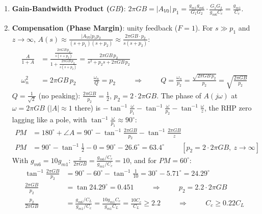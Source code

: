 \begin{enumerate}
  \item \textbf{Gain-Bandwidth Product (\(GB\))}:
    \(2\pi GB = |A_{V0}|\, p_1 = \frac{g_{m1} g_{m6}}{G_1 G_2} \cdot \frac{G_1 G_2}{g_{m6} C_c} = \frac{g_{m1}}{C_c}\).
  \item \textbf{Compensation (Phase Margin)}: unity feedback (\(F = 1\)). For
    \(s \gg p_1\) and \(z \to \infty\), \(A(s) \approx \frac{|A_{V0}| p_1 p_2}{(s + p_1)(s + p_2)} \approx \frac{2\pi GB \cdot p_2}{s(s + p_2)}\):
    \begin{align*}
      \frac{A}{1 + A} &= \frac{\frac{2\pi GB\, p_2}{s(s + p_2)}}{1 + \frac{2\pi GB\, p_2}{s(s + p_2)}} = \frac{2\pi GB\, p_2}{s^2 + p_2 s + 2\pi GB\, p_2} \\
      \omega_n^2 &= 2\pi GB\, p_2 \hspace{1cm} \frac{\omega_n}{Q} = p_2 \hspace{1cm} \Rightarrow \hspace{1cm} Q = \frac{\omega_n}{p_2} = \frac{\sqrt{2\pi GB\, p_2}}{p_2} = \sqrt{\frac{2\pi GB}{p_2}}
    \end{align*}
    \(Q = \frac{1}{\sqrt{2}}\) (no peaking): \(\frac{2\pi GB}{p_2} = \frac{1}{2}\), \(p_2 = 2 \cdot 2\pi GB\).
    The phase of \(A(j\omega)\) at \(\omega = 2\pi GB\) (\(|A| \approx 1\) there) is
    \(-\tan^{-1}\frac{\omega}{p_1} - \tan^{-1}\frac{\omega}{p_2} - \tan^{-1}\frac{\omega}{z}\), the RHP zero
    lagging like a pole, with \(\tan^{-1}\frac{\omega}{p_1} \approx 90^\circ\):
    \begin{align*}
      PM &= 180^\circ + \angle A = 90^\circ - \tan^{-1}\frac{2\pi GB}{p_2} - \tan^{-1}\frac{2\pi GB}{z} \\
      PM &= 90^\circ - \tan^{-1}\frac{1}{2} - 0 = 90^\circ - 26.6^\circ = 63.4^\circ \hspace{1cm} [p_2 = 2 \cdot 2\pi GB,\ z \to \infty]
    \end{align*}
    With \(g_{m6} = 10 g_{m1}\): \(\frac{z}{2\pi GB} = \frac{g_{m6}/C_c}{g_{m1}/C_c} = 10\), and for \(PM = 60^\circ\):
    \begin{align*}
      \tan^{-1}\frac{2\pi GB}{p_2} &= 90^\circ - 60^\circ - \tan^{-1}\frac{1}{10} = 30^\circ - 5.71^\circ = 24.29^\circ \\
      \frac{2\pi GB}{p_2} &= \tan 24.29^\circ = 0.451 \hspace{1cm} \Rightarrow \hspace{1cm} p_2 = 2.2 \cdot 2\pi GB \\
      \frac{p_2}{2\pi GB} &= \frac{g_{m6}/C_L}{g_{m1}/C_c} = \frac{10 g_{m1} C_c}{g_{m1} C_L} = \frac{10 C_c}{C_L} \geq 2.2 \hspace{1cm} \Rightarrow \hspace{1cm} C_c \geq 0.22 C_L

\end{align*}
\end{enumerate}
